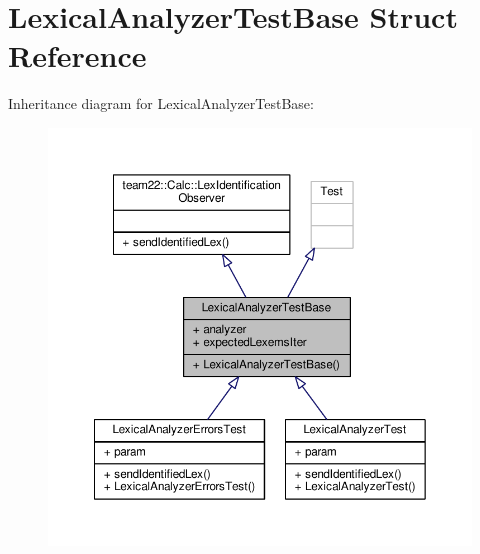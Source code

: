 \hypertarget{struct_lexical_analyzer_test_base}{}\section{Lexical\+Analyzer\+Test\+Base Struct Reference}
\label{struct_lexical_analyzer_test_base}


Inheritance diagram for Lexical\+Analyzer\+Test\+Base\+:
\nopagebreak
\begin{figure}[H]
\begin{center}
\leavevmode
\includegraphics[width=350pt]{struct_lexical_analyzer_test_base__inherit__graph}
\end{center}
\end{figure}


